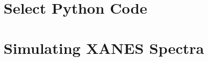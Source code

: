\documentclass[12pt, oneside]{book}
\begin{document}
\appendix 


\chapter{Select Python Code}


\chapter{Simulating XANES Spectra}


% 


\renewcommand{\bibname}{References}
% 




\pagebreak
\chapter*{~}


\end{document}
